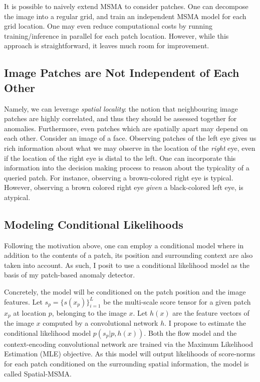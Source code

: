 It is possible to naively extend MSMA to consider patches. One can decompose the image into a regular grid, and train an independent MSMA model for each grid location. One may even reduce computational costs by running training/inference in parallel for each patch location. However, while this approach is straightforward, it leaves much room for improvement.

\subsection*{Image Patches are Not Independent of Each Other}
Namely, we can leverage \textit{spatial locality}: the notion that neighbouring image patches are highly correlated, and thus they should be assessed together for anomalies. Furthermore, even patches which are spatially apart may depend on each other. Consider an image of a face.
Observing patches of the left eye gives us rich information about what we may observe in the location of the \textit{right} eye, even if the location of the right eye is distal to the left.
One can incorporate this information into the decision making process to reason about the typicality of a queried patch. For instance, observing a brown-colored right eye is typical. However, observing a brown colored right eye \textit{given} a black-colored left eye, is atypical.

\subsection*{Modeling Conditional Likelihoods}
Following the motivation above, one can employ a conditional model where in addition to the contents of a patch, its position and surrounding context are also taken into account. As such, I posit to use a conditional likelihood model as the basis of my patch-based anomaly detector.

Concretely, the model will be conditioned on the patch position and the image features. Let $ s_p = \{s(x_p)\}_{i=1}^{L}$ be the multi-scale score tensor for a given patch $x_p$ at location $p$, belonging to the image $x$. Let $h(x)$ are the feature vectors of the image $x$ computed by a convolutional network $h$. I propose to estimate the conditional likelihood model $p(s_p | p, h(x))$. Both the flow model and the context-encoding convolutional network are trained via the Maximum Likelihood Estimation (MLE) objective. As this model will output likelihoods of score-norms for each patch conditioned on the surrounding spatial information, the model is called Spatial-MSMA.

